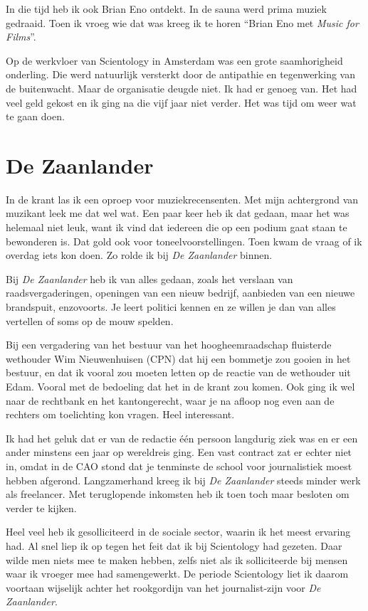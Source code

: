 \documentclass[10pt,twoside, openright]{memoir}
\begin{document}
In die tijd heb ik ook Brian Eno ontdekt. In de sauna werd prima muziek gedraaid. Toen ik vroeg wie dat was kreeg ik te horen ``Brian Eno met \emph{Music for Films}''.

Op de werkvloer van Scientology in Amsterdam was een grote saamhorigheid onderling. Die werd natuurlijk versterkt door de antipathie en tegenwerking van de buitenwacht. Maar de organisatie deugde niet. Ik had er genoeg van. Het had veel geld gekost en ik ging na die vijf jaar niet verder. Het was tijd om weer wat te gaan doen.

\section{De Zaanlander} %
\label{cha:zaanlander}

In de krant las ik een oproep voor muziekrecensenten. Met mijn achtergrond van muzikant leek me dat wel wat. Een paar keer heb ik dat gedaan, maar het was helemaal niet leuk, want ik vind dat iedereen die op een podium gaat staan te bewonderen is. Dat gold ook voor toneelvoorstellingen. Toen kwam de vraag of ik overdag iets kon doen. Zo rolde ik bij \emph{De Zaanlander} binnen. 

Bij \emph{De Zaanlander} heb ik van alles gedaan, zoals het verslaan van raadsvergaderingen, openingen van een nieuw bedrijf, aanbieden van een nieuwe brandspuit, enzovoorts. Je leert politici kennen en ze willen je dan van alles vertellen of soms op de mouw spelden. 

Bij een vergadering van het bestuur van het hoogheemraadschap fluisterde wethouder Wim Nieuwenhuisen (CPN) dat hij een bommetje zou gooien in het bestuur, en dat ik vooral zou moeten letten op de reactie van de wethouder uit Edam. Vooral met de bedoeling dat het in de krant zou komen. Ook ging ik wel naar de rechtbank en het kantongerecht, waar je na afloop nog even aan de rechters om toelichting kon vragen. Heel interessant. 

Ik had het geluk dat er van de redactie één persoon langdurig ziek was en er een ander minstens een jaar op wereldreis ging. Een vast contract zat er echter niet in, omdat in de CAO stond dat je tenminste de school voor journalistiek moest hebben afgerond. Langzamerhand kreeg ik bij \emph{De Zaanlander} steeds minder werk als freelancer. Met teruglopende inkomsten heb ik toen toch maar besloten om verder te kijken.

Heel veel heb ik gesolliciteerd in de sociale sector, waarin ik het meest ervaring had. Al snel liep ik op tegen het feit dat ik bij Scientology had gezeten. Daar wilde men niets mee te maken hebben, zelfs niet als ik solliciteerde bij mensen waar ik vroeger mee had samengewerkt. De periode Scientology liet ik daarom voortaan wijselijk achter het rookgordijn van het journalist-zijn voor \emph{De Zaanlander}.
\end{document}
